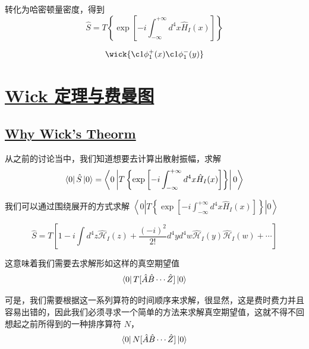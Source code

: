 转化为哈密顿量密度，得到
\begin{equation}
    \hat{S} = T\left\{\exp\left[-i\int_{-\infty}^{+\infty}d^4x \hat{H}_I(x)\right]\right\}
\end{equation}

\begin{equation}
    \wick{
        \c1 \phi_1^+ (x)  \c1 \phi_1^- (y)
    }
\end{equation}




\section{\protect\hyperlink{:}{Wick 定理与费曼图}}

\subsection{\protect\hyperlink{:}{Why Wick's Theorm}}

从之前的讨论当中，我们知道想要去计算出散射振幅，求解
\begin{equation}
    \bra{0}\hat{S}\ket{0} = \left\langle 0 \left|T\left\{\exp\left[-i\int_{-\infty}^{+\infty}d^4x \hat{H}_I(x)\right]\right\}\right|0\right\rangle
\end{equation}

我们可以通过围绕展开的方式求解 $ \left\langle 0 \left|T\left\{\exp\left[-i\int_{-\infty}^{+\infty}d^4x \hat{H}_I(x)\right]\right\}\right|0\right\rangle $ 

\begin{equation}
    \hat{S} = T\left[1 - i\int d^4 z \hat{\mathcal{H}}_I(z) + \frac{(-i)^2}{2!} d^4y d^4w \hat{\mathcal{H}}_I(y) \hat{\mathcal{H}}_I(w) + \cdots\right]
\end{equation}

这意味着我们需要去求解形如这样的真空期望值
\begin{equation}
    \bra{0}T[\hat{A}\hat{B}\cdots\hat{Z}]\ket{0}
\end{equation}

可是，我们需要根据这一系列算符的时间顺序来求解，很显然，这是费时费力并且容易出错的，因此我们必须寻求一个简单的方法来求解真空期望值，这就不得不回想起之前所得到的一种排序算符 $N$，
\begin{equation}
    \bra{0}N[\hat{A}\hat{B}\cdots\hat{Z}]\ket{0}
\end{equation}

